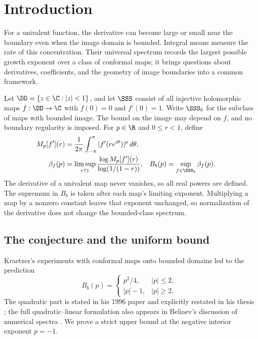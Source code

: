 \section{Introduction}\label{sec:introduction}

For a univalent function, the derivative can become large or small near
the boundary even when the image domain is bounded. Integral means
measure the rate of this concentration. Their universal spectrum records
the largest possible growth exponent over a class of conformal maps;
it brings questions about derivatives, coefficients, and the geometry
of image boundaries into a common framework.

Let \(\DD=\{z\in\C:|z|<1\}\), and let \(\SSS\) consist of all
injective holomorphic maps \(f:\DD\to\C\) with \(f(0)=0\) and
\(f'(0)=1\). Write \(\SSS_b\) for the subclass of maps with bounded
image. The bound on the image may depend on \(f\), and no boundary
regularity is imposed. For \(p\in\R\) and \(0\le r<1\), define
\begin{align*}
 M_p[f'](r)&=\frac1{2\pi}\int_{-\pi}^{\pi}|f'(re^{i\theta})|^p\,d\theta,\\
 \beta_f(p)&=\limsup_{r\uparrow1}
 \frac{\log M_p[f'](r)}{\log(1/(1-r))},
 &B_b(p)&=\sup_{f\in\SSS_b}\beta_f(p).
\end{align*}
The derivative of a univalent map never vanishes, so all real powers
are defined. The supremum in \(B_b\) is taken after each map's limiting
exponent. Multiplying a map by a nonzero constant leaves that exponent
unchanged, so normalization of the derivative does not change the
bounded-class spectrum.

\subsection{The conjecture and the uniform bound}

Kraetzer's experiments with conformal maps onto bounded domains led
to the prediction
\begin{equation}\label{eq:kraetzer}
 B_b(p)=
 \begin{cases}
 p^2/4,&|p|\le2,\\
 |p|-1,&|p|\ge2.
 \end{cases}
\end{equation}
The quadratic part is stated in his 1996 paper and explicitly
restated in his thesis \cite{Kraetzer,KraetzerThesis}; the full
quadratic--linear formulation also appears in Beliaev's discussion
of numerical spectra \cite{Beliaev}. We prove a strict upper bound
at the negative interior exponent \(p=-1\).

